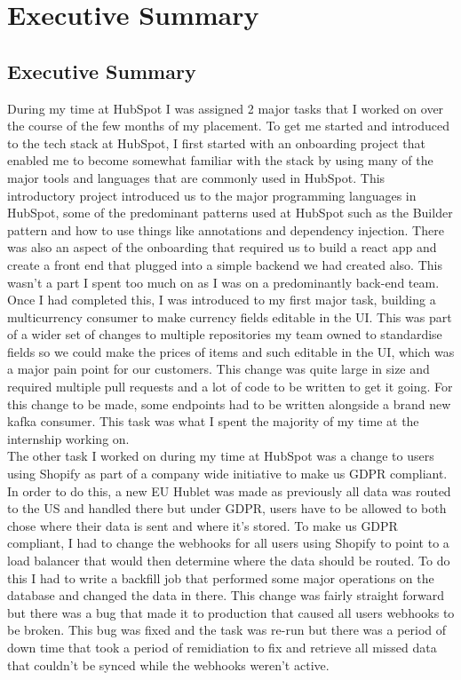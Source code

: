 \chapter{Executive Summary}

\section{Executive Summary}
During my time at HubSpot I was assigned 2 major tasks that I worked on over the course of the few months of my placement. To get me started and introduced to the tech stack at HubSpot, I first started with an onboarding project that enabled me to become somewhat familiar with the stack by using many of the major tools and languages that are commonly used in HubSpot. This introductory project introduced us to the major programming languages in HubSpot, some of the predominant patterns used at HubSpot such as the Builder pattern and how to use things like annotations and dependency injection. There was also an aspect of the onboarding that required us to build a react app and create a front end that plugged into a simple backend we had created also. This wasn't a part I spent too much on as I was on a predominantly back-end team.\newline \\ Once I had completed this, I was introduced to my first major task, building a multicurrency consumer to make currency fields editable in the UI. This was part of a wider set of changes to multiple repositories my team owned to standardise fields so we could make the prices of items and such editable in the UI, which was a major pain point for our customers. This change was quite large in size and required multiple pull requests and a lot of code to be written to get it going. For this change to be made, some endpoints had to be written alongside a brand new kafka consumer. This task was what I spent the majority of my time at the internship working on. \newline \\The other task I worked on during my time at HubSpot was a change to users using Shopify as part of a company wide initiative to make us GDPR compliant. In order to do this, a new EU Hublet was made as previously all data was routed to the US and handled there but under GDPR, users have to be allowed to both chose where their data is sent and where it's stored. To make us GDPR compliant, I had to change the webhooks for all users using Shopify to point to a load balancer that would then determine where the data should be routed. To do this I had to write a backfill job that performed some major operations on the database and changed the data in there. This change was fairly straight forward but there was a bug that made it to production that caused all users webhooks to be broken. This bug was fixed and the task was re-run but there was a period of down time that took a period of remidiation to fix and retrieve all missed data that couldn't be synced while the webhooks weren't active.